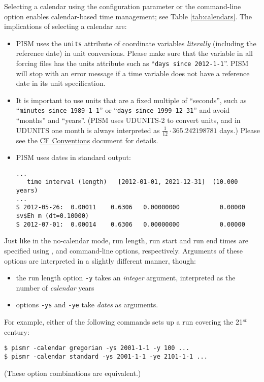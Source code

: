 Selecting a calendar using the  configuration parameter or the  command-line option enables calendar-based time management; see Table \ref{tab:calendars}.  The implications of selecting a calendar are:
\begin{itemize}
\item PISM uses the \texttt{units} attribute of coordinate variables
  \emph{literally} (including the reference date) in unit conversions. Please
  make sure that the  variable in all forcing files has the
  units attribute such as ``\texttt{days since 2012-1-1}''. PISM will stop with
  an error message if a time variable does not have a reference date in its
  unit specification.
\item It is important to use units that are a fixed multiple of ``seconds'',
  such as ``\texttt{minutes since 1989-1-1}'' or ``\texttt{days since
    1999-12-31}'' and avoid ``months'' and ``years''. (PISM uses UDUNITS-2 to
  convert units, and in UDUNITS one month is always interpreted as
  $\frac{1}{12}\cdot 365.242198781$ days.) Please see the 
  \href{http://cf-pcmdi.llnl.gov/documents/cf-conventions/1.6/cf-conventions.html#time-coordinate}{CF
    Conventions} document for details.
\item PISM uses dates in standard output:
\begin{verbatim}
...
   time interval (length)   [2012-01-01, 2021-12-31]  (10.000 years)
...
S 2012-05-26:  0.00011    0.6306   0.00000000           0.00000
$v$Eh m (dt=0.10000)
S 2012-07-01:  0.00014    0.6306   0.00000000           0.00000
\end{verbatim}
\end{itemize}

Just like in the no-calendar mode, run length, run start and run end
times are specified using ,  and
 command-line options, respectively. Arguments of
these options are interpreted in a slightly different manner, though:
\begin{itemize}
\item the run length option \texttt{-y} takes an \emph{integer}
  argument, interpreted as the number of \emph{calendar} years
\item options \texttt{-ys} and \texttt{-ye} take \emph{dates} as arguments.
\end{itemize}

For example, either of the following commands sets up a run covering the 21$^{st}$ century:
\begin{verbatim}
$ pismr -calendar gregorian -ys 2001-1-1 -y 100 ...
$ pismr -calendar standard -ys 2001-1-1 -ye 2101-1-1 ...
\end{verbatim}
(These option combinations are equivalent.)

